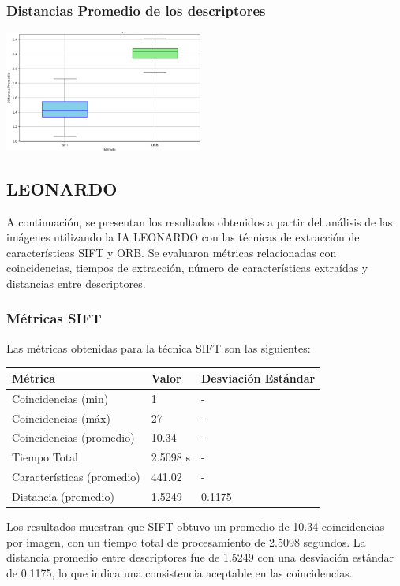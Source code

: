 \documentclass[unnumsec,webpdf,modern,large]{mam-authoring-template}
\theoremstyle{thmstyleone}%
\theoremstyle{thmstyletwo}%
\theoremstyle{thmstylethree}%
\begin{document}
\subsubsection{Distancias Promedio de los descriptores}
\includegraphics[width=6.5cm]{2.2.jpg}


\subsection{LEONARDO}  
A continuación, se presentan los resultados obtenidos a partir del análisis de las imágenes utilizando la IA LEONARDO con las técnicas de extracción de características SIFT y ORB. Se evaluaron métricas relacionadas con coincidencias, tiempos de extracción, número de características extraídas y distancias entre descriptores.

\subsubsection{Métricas SIFT}

Las métricas obtenidas para la técnica SIFT son las siguientes:

\begin{center}
\begin{tabular}{ | m{7em} | m{1.5cm} | m{1.5cm} | } 
  \hline
  \textbf{Métrica} & \textbf{Valor} & \textbf{Desviación Estándar} \\ 
  \hline
  Coincidencias (min) & 1 & - \\ 
  \hline
  Coincidencias (máx) & 27 & - \\ 
  \hline
  Coincidencias (promedio) & 10.34 & - \\ 
  \hline
  Tiempo Total & 2.5098 s & - \\ 
  \hline
  Características (promedio) & 441.02 & - \\ 
  \hline
  Distancia (promedio) & 1.5249 & 0.1175 \\ 
  \hline
\end{tabular}
\end{center}

Los resultados muestran que SIFT obtuvo un promedio de 10.34 coincidencias por imagen, con un tiempo total de procesamiento de 2.5098 segundos. La distancia promedio entre descriptores fue de 1.5249 con una desviación estándar de 0.1175, lo que indica una consistencia aceptable en las coincidencias.
\end{document}
